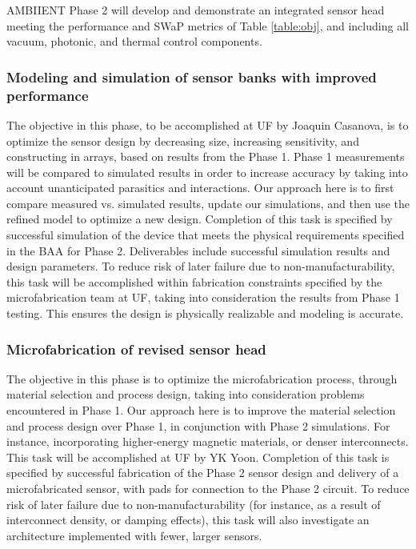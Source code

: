 AMBIIENT Phase 2 will develop and demonstrate an integrated sensor head meeting the performance and SWaP metrics of Table \ref{table:obj}, and including all vacuum, photonic, and thermal control components.

\subsubsection{Modeling and simulation of sensor banks with improved performance}\label{sec:p2:em}

The objective in this phase, to be accomplished at UF by Joaquin Casanova, is to optimize the sensor design by decreasing size, increasing sensitivity, and constructing in arrays, based on results from the Phase 1. Phase 1 measurements will be compared to simulated results in order to increase accuracy by taking into account unanticipated parasitics and interactions. Our approach here is to first compare measured vs. simulated results, update our simulations, and then use the refined model to optimize a new design. Completion of this task is specified by successful simulation of the device that meets the physical requirements specified in the BAA for Phase 2. Deliverables include successful simulation results and design parameters. To reduce risk of later failure due to non-manufacturability, this task will be accomplished within fabrication constraints specified by the microfabrication team at UF, taking into consideration the results from Phase 1 testing. This ensures the design is physically realizable and modeling is accurate.

\subsubsection{Microfabrication of revised sensor head}\label{sec:p2:mf}

The objective in this phase is to optimize the microfabrication process, through material selection and process design, taking into consideration problems encountered in Phase 1. Our approach here is to improve the material selection and process design over Phase 1, in conjunction with Phase 2 simulations. For instance, incorporating higher-energy magnetic materials, or denser interconnects. This task will be accomplished at UF by YK Yoon. Completion of this task is specified by successful fabrication of the Phase 2 sensor design and delivery of a microfabricated sensor, with pads for connection to the Phase 2 circuit. To reduce risk of later failure due to non-manufacturability (for instance, as a result of interconnect density, or damping effects), this task will also investigate an architecture implemented with fewer, larger sensors.


